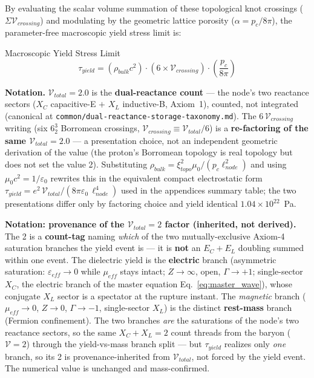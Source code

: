 By evaluating the scalar volume summation of these topological knot crossings ($\Sigma \mathcal{V}_{crossing}$) and modulating by the geometric lattice porosity ($\alpha = p_c/8\pi$), the parameter-free macroscopic yield stress limit is:
\begin{resultbox}{Macroscopic Yield Stress Limit}
\begin{equation}
    \tau_{yield} = (\rho_{bulk} c^2) \cdot (6 \times \mathcal{V}_{crossing}) \cdot \left(\frac{p_c}{8\pi}\right)
\end{equation}
\end{resultbox}

\noindent\textbf{Notation.} $\mathcal{V}_{total} = 2.0$ is the \textbf{dual-reactance count} --- the node's two reactance sectors ($X_C$ capacitive-E $+$ $X_L$ inductive-B, Axiom~1), counted, not integrated (canonical at \texttt{common/dual-reactance-storage-taxonomy.md}). The $6\,\mathcal{V}_{crossing}$ writing (six $6^3_2$ Borromean crossings, $\mathcal{V}_{crossing} \equiv \mathcal{V}_{total}/6$) is a \textbf{re-factoring of the same $\mathcal{V}_{total} = 2.0$} --- a presentation choice, not an independent geometric derivation of the value (the proton's Borromean topology is real topology but does not set the value 2). Substituting $\rho_{bulk} = \xi_{topo}^2 \mu_0/(p_c \ell_{node}^2)$ and using $\mu_0 c^2 = 1/\varepsilon_0$ rewrites this in the equivalent compact electrostatic form $\tau_{yield} = e^2\,\mathcal{V}_{total}/(8\pi\varepsilon_0\,\ell_{node}^4)$ used in the appendices summary table; the two presentations differ only by factoring choice and yield identical $1.04\times 10^{22}$~Pa.

\noindent\textbf{Notation: provenance of the $\mathcal{V}_{total} = 2$ factor (inherited, not derived).} The 2 is a \textbf{count-tag} naming \emph{which} of the two mutually-exclusive Axiom-4 saturation branches the yield event is --- it is \textbf{not} an $E_C + E_L$ doubling summed within one event. The dielectric yield is the \textbf{electric} branch (asymmetric saturation: $\varepsilon_{eff} \to 0$ while $\mu_{eff}$ stays intact; $Z \to \infty$, open, $\Gamma \to +1$\gammaundeclared{}; single-sector $X_C$, the electric branch of the master equation Eq.~\ref{eq:master_wave}), whose conjugate $X_L$ sector is a spectator at the rupture instant. The \emph{magnetic} branch ($\mu_{eff} \to 0$, $Z \to 0$, $\Gamma \to -1$\gammaundeclared{}, single-sector $X_L$) is the distinct \textbf{rest-mass} branch (Fermion confinement). The two branches \emph{are} the saturations of the node's two reactance sectors, so the same $X_C + X_L = 2$ count threads from the baryon ($\mathcal{V} = 2$) through the yield-vs-mass branch split --- but $\tau_{yield}$ realizes only \emph{one} branch, so its 2 is provenance-inherited from $\mathcal{V}_{total}$, not forced by the yield event. The numerical value is unchanged and mass-confirmed.

